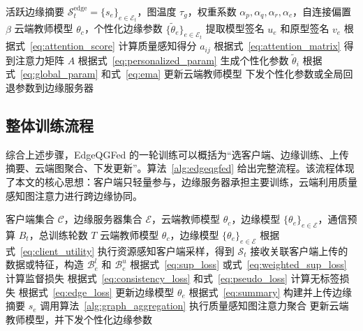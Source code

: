 \documentclass[journal]{IEEEtran}
\begin{document}
\begin{algorithm}[t]
\caption{云端质量感知图注意力聚合}
\label{alg:graph_aggregation}
\begin{algorithmic}[1]
\REQUIRE 活跃边缘摘要 $\mathcal{S}^{\mathrm{edge}}_t=\{s_e\}_{e\in\mathcal{E}_t}$，图温度 $\tau_g$，权重系数 $\alpha_p,\alpha_q,\alpha_r,\alpha_c$，自连接偏置 $\beta$
\ENSURE 云端教师模型 $\theta_c$，个性化边缘参数 $\{\tilde{\theta}_e\}_{e\in\mathcal{E}_t}$
    \STATE 提取模型签名 $u_e$ 和原型签名 $v_e$
\ENDFOR
{}
    \STATE 根据式~\eqref{eq:attention_score} 计算质量感知得分 $a_{ij}$
\ENDFOR
\STATE 根据式~\eqref{eq:attention_matrix} 得到注意力矩阵 $A$
    \STATE 根据式~\eqref{eq:personalized_param} 生成个性化参数 $\tilde{\theta}_i$
\ENDFOR
\STATE 根据式~\eqref{eq:global_param} 和式~\eqref{eq:ema} 更新云端教师模型
\STATE 下发个性化参数或全局回退参数到边缘服务器
\end{algorithmic}
\end{algorithm}

\subsection{整体训练流程}
\label{subsec:procedure}

综合上述步骤，EdgeQGFed 的一轮训练可以概括为“选客户端、边缘训练、上传摘要、云端图聚合、下发更新”。算法~\ref{alg:edgeqgfed} 给出完整流程。该流程体现了本文的核心思想：客户端只轻量参与，边缘服务器承担主要训练，云端利用质量感知图注意力进行跨边缘协同。

\begin{algorithm}[t]
\caption{EdgeQGFed 云边端协同训练流程}
\label{alg:edgeqgfed}
\begin{algorithmic}[1]
\REQUIRE 客户端集合 $\mathcal{C}$，边缘服务器集合 $\mathcal{E}$，云端教师模型 $\theta_c$，边缘模型 $\{\theta_e\}_{e\in\mathcal{E}}$，通信预算 $B_t$，总训练轮数 $T$
\ENSURE 云端教师模型 $\theta_c$，边缘模型 $\{\theta_e\}_{e\in\mathcal{E}}$
    \STATE 根据式~\eqref{eq:client_utility} 执行资源感知客户端采样，得到 $\mathcal{S}_t$
        \STATE 接收关联客户端上传的数据或特征，构造 $\mathcal{B}_e^l$ 和 $\mathcal{B}_e^u$
        \STATE 根据式~\eqref{eq:sup_loss} 或式~\eqref{eq:weighted_sup_loss} 计算监督损失
        \STATE 根据式~\eqref{eq:consistency_loss} 和式~\eqref{eq:pseudo_loss} 计算无标签损失
        \STATE 根据式~\eqref{eq:edge_loss} 更新边缘模型 $\theta_e$
            \STATE 根据式~\eqref{eq:summary} 构建并上传边缘摘要 $s_e$
        \ENDIF
    \ENDFOR
        \STATE 调用算法~\ref{alg:graph_aggregation} 执行质量感知图注意力聚合
        \STATE 更新云端教师模型，并下发个性化边缘参数
    \ENDIF
\ENDFOR
\end{algorithmic}
\end{algorithm}
\end{document}
